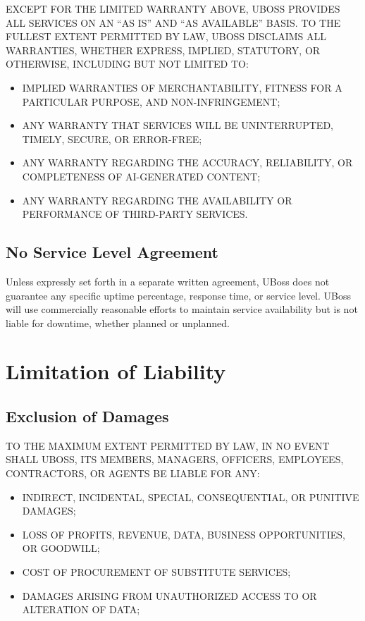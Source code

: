\documentclass[11pt,letterpaper,parskip=half]{scrartcl}
\begin{document}
\begin{tcolorbox}[keyterm, colback=white, colframe=charcoal, boxrule=0.8pt]
EXCEPT FOR THE LIMITED WARRANTY ABOVE, UBOSS PROVIDES ALL SERVICES ON AN ``AS IS'' AND ``AS AVAILABLE'' BASIS. TO THE FULLEST EXTENT PERMITTED BY LAW, UBOSS DISCLAIMS ALL WARRANTIES, WHETHER EXPRESS, IMPLIED, STATUTORY, OR OTHERWISE, INCLUDING BUT NOT LIMITED TO:

\begin{itemize}[nosep, leftmargin=1.5em]
    \item IMPLIED WARRANTIES OF MERCHANTABILITY, FITNESS FOR A PARTICULAR PURPOSE, AND NON-INFRINGEMENT;
    \item ANY WARRANTY THAT SERVICES WILL BE UNINTERRUPTED, TIMELY, SECURE, OR ERROR-FREE;
    \item ANY WARRANTY REGARDING THE ACCURACY, RELIABILITY, OR COMPLETENESS OF AI-GENERATED CONTENT;
    \item ANY WARRANTY REGARDING THE AVAILABILITY OR PERFORMANCE OF THIRD-PARTY SERVICES.
\end{itemize}
\end{tcolorbox}

\subsection{No Service Level Agreement}

Unless expressly set forth in a separate written agreement, UBoss does not guarantee any specific uptime percentage, response time, or service level. UBoss will use commercially reasonable efforts to maintain service availability but is not liable for downtime, whether planned or unplanned.

\section{Limitation of Liability}

\subsection{Exclusion of Damages}

TO THE MAXIMUM EXTENT PERMITTED BY LAW, IN NO EVENT SHALL UBOSS, ITS MEMBERS, MANAGERS, OFFICERS, EMPLOYEES, CONTRACTORS, OR AGENTS BE LIABLE FOR ANY:

\begin{itemize}[nosep, leftmargin=1.5em]
    \item INDIRECT, INCIDENTAL, SPECIAL, CONSEQUENTIAL, OR PUNITIVE DAMAGES;
    \item LOSS OF PROFITS, REVENUE, DATA, BUSINESS OPPORTUNITIES, OR GOODWILL;
    \item COST OF PROCUREMENT OF SUBSTITUTE SERVICES;
    \item DAMAGES ARISING FROM UNAUTHORIZED ACCESS TO OR ALTERATION OF DATA;
\end{itemize}
\end{document}
